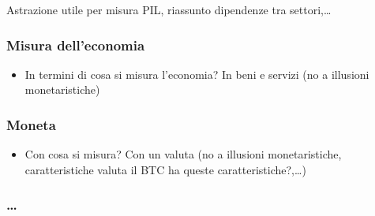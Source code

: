 \documentclass[letterpaper,10pt,italian]{jupyterBook}
\begin{document}
\sphinxAtStartPar
Astrazione utile per misura PIL, riassunto dipendenze tra settori,…
\subsubsection*{Misura dell’economia}
\begin{itemize}
\item {} 
\sphinxAtStartPar
In termini di cosa si misura l’economia? In beni e servizi (no a illusioni monetaristiche)

\end{itemize}
\subsubsection*{Moneta}
\begin{itemize}
\item {} 
\sphinxAtStartPar
Con cosa si misura? Con un valuta (no a illusioni monetaristiche, caratteristiche valuta \sphinxhyphen{} il BTC ha queste caratteristiche?,…)

\end{itemize}
\subsubsection*{…}
\end{document}
